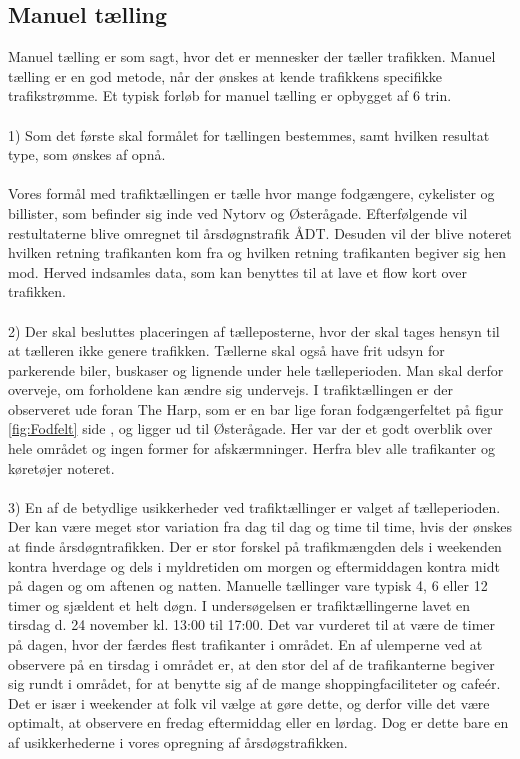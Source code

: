 \subsection{Manuel tælling}
\label{sub:manuel_taelling}
Manuel tælling er som sagt, hvor det er mennesker der tæller trafikken. Manuel tælling er en god metode, når der ønskes at kende trafikkens specifikke trafikstrømme. Et typisk forløb for manuel tælling er opbygget af 6 trin.
~\\\\
1) Som det første skal formålet for tællingen bestemmes, samt hvilken resultat type, som ønskes af opnå.
~\\\\
Vores formål med trafiktællingen er tælle hvor mange fodgængere, cykelister og billister, som befinder sig inde ved Nytorv og Østerågade. Efterfølgende vil restultaterne blive omregnet  til årsdøgnstrafik ÅDT. Desuden vil der blive noteret hvilken retning trafikanten kom fra og hvilken retning trafikanten begiver sig hen mod. Herved indsamles data, som kan benyttes til at lave et flow kort over trafikken.
~\\\\
2) Der skal besluttes placeringen af tælleposterne, hvor der skal tages hensyn til at tælleren ikke genere trafikken. Tællerne skal også have frit udsyn for parkerende biler, buskaser og lignende under hele tælleperioden. Man skal derfor overveje, om forholdene kan ændre sig undervejs. I trafiktællingen er der observeret ude foran The Harp, som er en bar lige foran fodgængerfeltet på figur \cref{fig:Fodfelt} side \pageref{fig:Fodfelt}, og ligger ud til Østerågade. Her var der et godt overblik over hele området og ingen former for afskærmninger. Herfra blev alle trafikanter og køretøjer noteret.
~\\\\
3) En af de betydlige usikkerheder ved trafiktællinger er valget af tælleperioden. Der kan være meget stor variation fra dag til dag og time til time, hvis der ønskes at finde årsdøgntrafikken. Der er stor forskel på trafikmængden dels i weekenden kontra hverdage og dels i myldretiden om morgen og eftermiddagen kontra midt på dagen og om aftenen og natten. Manuelle tællinger vare typisk 4, 6 eller 12 timer og sjældent et helt døgn. I undersøgelsen er trafiktællingerne lavet en tirsdag d. 24 november kl. 13:00 til 17:00. Det var vurderet til at være de timer på dagen, hvor der færdes flest trafikanter i området. En af ulemperne ved at observere på en tirsdag i området er, at den stor del af de trafikanterne begiver sig rundt i området, for at benytte sig af de mange shoppingfaciliteter og cafeér. Det er især i weekender at folk vil vælge at gøre dette, og derfor ville det være optimalt, at observere en fredag eftermiddag eller en lørdag. Dog er dette bare en af usikkerhederne i vores opregning af årsdøgstrafikken.
